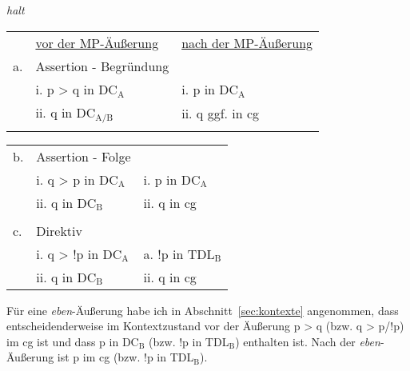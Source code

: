 \begin{exe}
        \ex\label{655} \textit{halt}\\
    \begin{tabular}[t]{lll}
    & \ul{vor der MP-Äußerung} & \ul{nach der MP-Äußerung}\\
    a. & Assertion - Begründung & {}\\
    {} & i. p > q in DC$_{\textrm{A}}$ & i. p in DC$_{\textrm{A}}$\\
	{} & ii. q in DC$_{\textrm{A/B}}$ & ii. q ggf. in cg\\
	{} & {} & {}\\
    \end{tabular}\par\pagebreak
    \begin{tabular}[t]{lll}
	b. & Assertion - Folge & {}\\
	{} & i. q > p in DC$_{\textrm{A}}$ & i. p in DC$_{\textrm{A}}$\\
	{} & ii. q in DC$_{\textrm{B}}$ & ii. q in cg\\
	{} & {} & {}\\
	c. & Direktiv & {}\\
	{} & i. q > !p in DC$_{\textrm{A}}$ & a. !p in TDL$_{\textrm{B}}$\\
	{} & ii. q in DC$_{\textrm{B}}$ & ii. q in cg\\
    \end{tabular}
\end{exe}
Für eine \textit{eben}-Äußerung habe ich in Abschnitt~\ref{sec:kontexte} angenommen, dass entscheidenderweise im Kontextzustand vor der Äußerung p > q (bzw. q > p/!p) im cg ist und dass p in DC$_{\textrm{B}}$ (bzw. !p in TDL$_{\textrm{B}}$) enthalten ist. Nach der \textit{eben}-Äußerung ist p im cg (bzw. !p in TDL$_{\textrm{B}}$).

